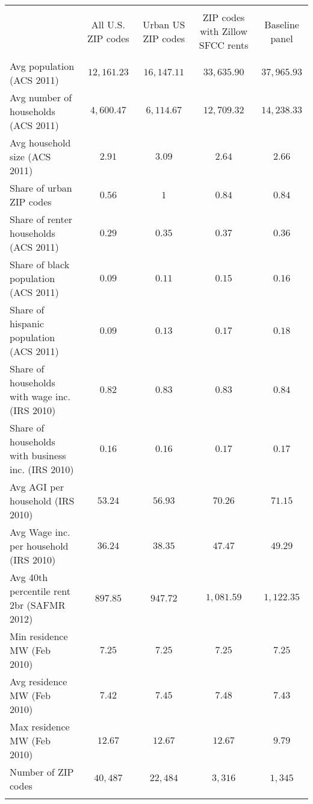  
 \begin{tabular}{@{\extracolsep{5pt}} lcccc}  
 \\[-1.8ex]\hline  
 \hline \\[-1.8ex]  
  & All U.S. ZIP codes & Urban US ZIP codes & ZIP codes with Zillow SFCC rents & Baseline panel \\  
 \hline \\[-1.8ex]  
 Avg population (ACS 2011) & $12,161.23$ & $16,147.11$ & $33,635.90$ & $37,965.93$ \\  
 Avg number of households (ACS 2011) & $4,600.47$ & $6,114.67$ & $12,709.32$ & $14,238.33$ \\  
 Avg household size (ACS 2011) & $2.91$ & $3.09$ & $2.64$ & $2.66$ \\  
 Share of urban ZIP codes & $0.56$ & $1$ & $0.84$ & $0.84$ \\  
 Share of renter households (ACS 2011) & $0.29$ & $0.35$ & $0.37$ & $0.36$ \\  
 Share of black population (ACS 2011) & $0.09$ & $0.11$ & $0.15$ & $0.16$ \\  
 Share of hispanic population (ACS 2011) & $0.09$ & $0.13$ & $0.17$ & $0.18$ \\  
 Share of households with wage inc. (IRS 2010) & $0.82$ & $0.83$ & $0.83$ & $0.84$ \\  
 Share of households with  business inc. (IRS 2010) & $0.16$ & $0.16$ & $0.17$ & $0.17$ \\  
 Avg AGI per household (IRS 2010) & $53.24$ & $56.93$ & $70.26$ & $71.15$ \\  
 Avg Wage inc. per household (IRS 2010) & $36.24$ & $38.35$ & $47.47$ & $49.29$ \\  
 Avg 40th percentile rent 2br (SAFMR 2012) & $897.85$ & $947.72$ & $1,081.59$ & $1,122.35$ \\  
 Min residence MW (Feb 2010) & $7.25$ & $7.25$ & $7.25$ & $7.25$ \\  
 Avg residence MW (Feb 2010) & $7.42$ & $7.45$ & $7.48$ & $7.43$ \\  
 Max residence MW (Feb 2010) & $12.67$ & $12.67$ & $12.67$ & $9.79$ \\  
 Number of ZIP codes & $40,487$ & $22,484$ & $3,316$ & $1,345$ \\  
 \hline \\[-1.8ex]  
 \end{tabular}  
